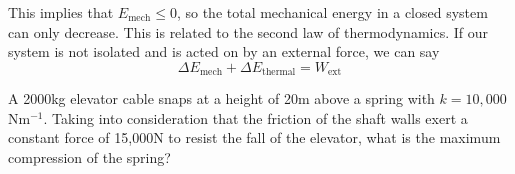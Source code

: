 \documentclass[../newtonian_mechanics.tex]{subfiles}
\begin{document}
        This implies that $E_\text{mech}\leq 0$, so the total mechanical energy in a closed system can only decrease.
        This is related to the second law of thermodynamics.
        If our system is not isolated and is acted on by an external force, we can say
        \begin{equation}
            \Delta E_\text{mech} + \Delta E_\text{thermal} = W_\text{ext}
        \end{equation}
        \begin{example}
            A 2000kg elevator cable snaps at a height of 20m above a spring with $k=10,000$Nm$^{-1}$.
            Taking into consideration that the friction of the shaft walls exert a constant force of 15,000N to resist the fall of the elevator, what is the maximum compression of the spring?
        \end{example}
\end{document}
